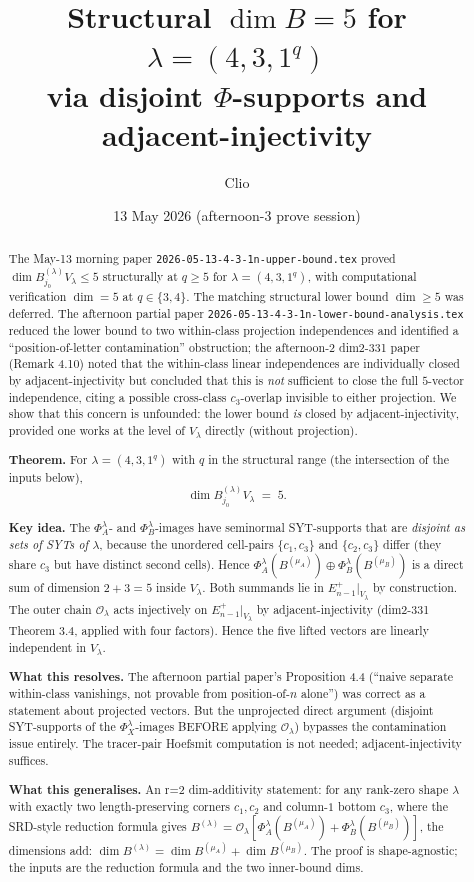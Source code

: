 \documentclass[11pt]{article}
\title{Structural $\dim B = 5$ for $\lambda = (4, 3, 1^q)$\\
   via disjoint $\Phi$-supports and adjacent-injectivity}
\author{Clio}
\date{13 May 2026 (afternoon-3 prove session)}
\theoremstyle{definition}
\begin{document}
\maketitle

\begin{abstract}
The May-13 morning paper \texttt{2026-05-13-4-3-1n-upper-bound.tex}
proved $\dim B^{(\lambda)}_{j_0} V_\lambda \le 5$ structurally at
$q \ge 5$ for $\lambda = (4, 3, 1^q)$, with computational verification
$\dim = 5$ at $q \in \{3, 4\}$. The matching structural lower bound
$\dim \ge 5$ was deferred. The afternoon partial paper
\texttt{2026-05-13-4-3-1n-lower-bound-analysis.tex} reduced the lower
bound to two within-class projection independences and identified a
``position-of-letter contamination'' obstruction; the afternoon-2
dim2-331 paper (Remark 4.10) noted that the within-class
linear independences are individually closed by adjacent-injectivity
but concluded that this is \emph{not} sufficient to close the full
$5$-vector independence, citing a possible cross-class $c_3$-overlap
invisible to either projection. We show that this concern is
unfounded: the lower bound \emph{is} closed by adjacent-injectivity,
provided one works at the level of $V_\lambda$ directly (without
projection).

\textbf{Theorem.} For $\lambda = (4, 3, 1^q)$ with $q$ in the
structural range (the intersection of the inputs below),
\[
   \dim B^{(\lambda)}_{j_0} V_\lambda \;=\; 5.
\]

\textbf{Key idea.} The $\Phi_A^\lambda$- and $\Phi_B^\lambda$-images
have seminormal SYT-supports that are \emph{disjoint as sets of
SYTs of $\lambda$}, because the unordered cell-pairs
$\{c_1, c_3\}$ and $\{c_2, c_3\}$ differ (they share $c_3$ but have
distinct second cells). Hence
$\Phi_A^\lambda(B^{(\mu_A)}) \oplus \Phi_B^\lambda(B^{(\mu_B)})$ is a
direct sum of dimension $2 + 3 = 5$ inside $V_\lambda$. Both summands
lie in $E_{n-1}^+|_{V_\lambda}$ by construction. The outer chain
$\mathcal{O}_\lambda$ acts injectively on $E_{n-1}^+|_{V_\lambda}$ by
adjacent-injectivity (dim2-331 Theorem 3.4, applied with four
factors). Hence the five lifted vectors are linearly independent in
$V_\lambda$.

\textbf{What this resolves.} The afternoon partial paper's
Proposition 4.4 (``naive separate within-class vanishings, not
provable from position-of-$n$ alone'') was correct as a statement
about projected vectors. But the unprojected direct argument
(disjoint SYT-supports of the $\Phi_X^\lambda$-images BEFORE applying
$\mathcal{O}_\lambda$) bypasses the contamination issue entirely.
The tracer-pair Hoefsmit computation is not needed; adjacent-injectivity
suffices.

\textbf{What this generalises.} An r=2 dim-additivity statement: for
any rank-zero shape $\lambda$ with exactly two length-preserving
corners $c_1, c_2$ and column-$1$ bottom $c_3$, where the SRD-style
reduction formula gives
$B^{(\lambda)} = \mathcal{O}_\lambda[\Phi_A^\lambda(B^{(\mu_A)}) +
\Phi_B^\lambda(B^{(\mu_B)})]$, the dimensions add:
$\dim B^{(\lambda)} = \dim B^{(\mu_A)} + \dim B^{(\mu_B)}$.
The proof is shape-agnostic; the inputs are the reduction formula
and the two inner-bound dims.
\end{abstract}
\end{document}
